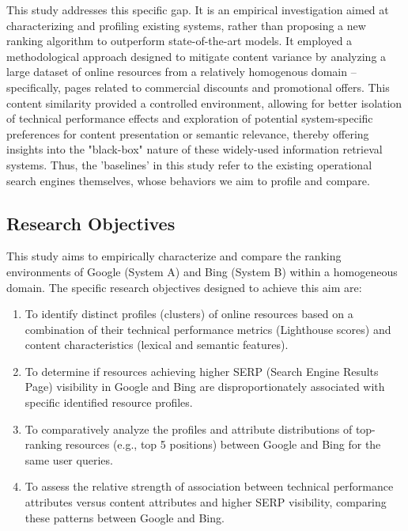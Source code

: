 \documentclass[a4paper,fleqn]{cas-sc}
\begin{document}
This study addresses this specific gap. It is an empirical investigation aimed at characterizing and profiling existing systems, rather than proposing a new ranking algorithm to outperform state-of-the-art models. It employed a methodological approach designed to mitigate content variance by analyzing a large dataset of online resources from a relatively homogenous domain – specifically, pages related to commercial discounts and promotional offers. This content similarity provided a controlled environment, allowing for better isolation of technical performance effects and exploration of potential system-specific preferences for content presentation or semantic relevance, thereby offering insights into the "black-box" nature of these widely-used information retrieval systems. Thus, the 'baselines' in this study refer to the existing operational search engines themselves, whose behaviors we aim to profile and compare.

\subsection{Research Objectives}
\label{subsec:aim}
This study aims to empirically characterize and compare the ranking environments of Google (System A) and Bing (System B) within a homogeneous domain. The specific research objectives designed to achieve this aim are:
\begin{enumerate}
    \item To identify distinct profiles (clusters) of online resources based on a combination of their technical performance metrics (Lighthouse scores) and content characteristics (lexical and semantic features).
    \item To determine if resources achieving higher SERP (Search Engine Results Page) visibility in Google and Bing are disproportionately associated with specific identified resource profiles.
    \item To comparatively analyze the profiles and attribute distributions of top-ranking resources (e.g., top 5 positions) between Google and Bing for the same user queries.
    \item To assess the relative strength of association between technical performance attributes versus content attributes and higher SERP visibility, comparing these patterns between Google and Bing.
\end{enumerate}
\end{document}
